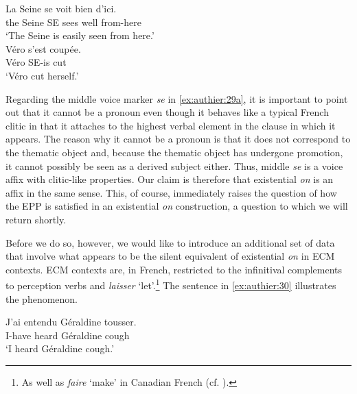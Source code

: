\documentclass[output=paper,colorlinks,citecolor=brown]{langscibook}
\begin{document}
\begin{exe}
\ex\label{ex:authier:29} 
\begin{xlist}
        \ex\label{ex:authier:29a} 
        \gll    La Seine se voit bien d’ici.\\
                the Seine SE sees well from-here\\
        \glt    `The Seine is easily seen from here.'\\
        \ex\label{ex:authier:29b} 
        \gll    Véro s’est coupée.\\
                Véro SE-is cut\\
        \glt    `Véro cut herself.'\\
\end{xlist}
\end{exe}


Regarding the middle voice marker \textit{se} in \ref{ex:authier:29a}, it is important to point out that it cannot be a pronoun even though it behaves like a typical French clitic in that it attaches to the highest verbal element in the clause in which it appears. The reason why it cannot be a pronoun is that it does not correspond to the thematic object and, because the thematic object has undergone promotion, it cannot possibly be seen as a derived subject either. Thus, middle \textit{se} is a voice affix with clitic-like properties. Our claim is therefore that existential \textit{on} is an affix in the same sense. This, of course, immediately raises the question of how the EPP is satisfied in an existential \textit{on} construction, a question to which we will return shortly.

Before we do so, however, we would like to introduce an additional set of data that involve what appears to be the silent equivalent of existential\textit{ on} in ECM contexts. ECM contexts are, in French, restricted to the infinitival complements to perception verbs and \textit{laisser} ‘let’.\footnote{As well as \textit{faire} ‘make’ in Canadian French (cf. \citealt{reed1992}). } The sentence in \ref{ex:authier:30} illustrates the phenomenon.

\begin{exe}
\ex\label{ex:authier:30} 
        \gll J’ai entendu Géraldine tousser.\\
             I-have heard Géraldine cough\\
        \glt `I heard Géraldine cough.'\\
\end{exe}
\end{document}
